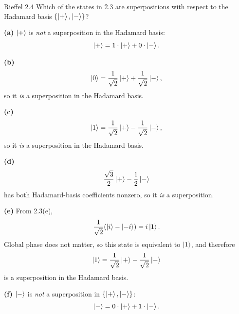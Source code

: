 \begin{exercise}{Rieffel 2.4}
Which of the states in 2.3 are superpositions with respect to the Hadamard basis $\{\left|+\right\rangle,\left|-\right\rangle\}$?
\end{exercise}
\begin{solution}
\textbf{(a)} $\left|+\right\rangle$ is \emph{not} a superposition in the Hadamard basis:
\[
\left|+\right\rangle=1\cdot\left|+\right\rangle+0\cdot\left|-\right\rangle.
\]

\textbf{(b)}
\[
\left|0\right\rangle=\frac{1}{\sqrt{2}}\left|+\right\rangle+\frac{1}{\sqrt{2}}\left|-\right\rangle,
\]
so it \emph{is} a superposition in the Hadamard basis.

\textbf{(c)}
\[
\left|1\right\rangle=\frac{1}{\sqrt{2}}\left|+\right\rangle-\frac{1}{\sqrt{2}}\left|-\right\rangle,
\]
so it \emph{is} a superposition in the Hadamard basis.

\textbf{(d)}
\[
\frac{\sqrt{3}}{2}\left|+\right\rangle-\frac{1}{2}\left|-\right\rangle
\]
has both Hadamard-basis coefficients nonzero, so it \emph{is} a superposition.

\textbf{(e)} From 2.3(e),
\[
\frac{1}{\sqrt{2}}(\left|i\right\rangle-\left|-i\right\rangle)=i\left|1\right\rangle.
\]
Global phase does not matter, so this state is equivalent to $\left|1\right\rangle$, and therefore
\[
\left|1\right\rangle=\frac{1}{\sqrt{2}}\left|+\right\rangle-\frac{1}{\sqrt{2}}\left|-\right\rangle
\]
is a superposition in the Hadamard basis.

\textbf{(f)} $\left|-\right\rangle$ is \emph{not} a superposition in $\{\left|+\right\rangle,\left|-\right\rangle\}$:
\[
\left|-\right\rangle=0\cdot\left|+\right\rangle+1\cdot\left|-\right\rangle.
\]
\end{solution}

